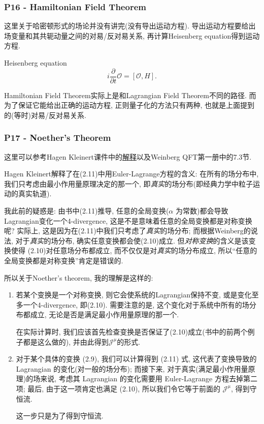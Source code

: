 \documentclass[cn,hazy,blue,11pt,device=normal,chinesefont=founder]{elegantnote}
\begin{document}
\subsubsection{P16 - Hamiltonian Field Theorem}

这里关于哈密顿形式的场论并没有讲完(没有导出运动方程). 导出运动方程要给出场变量和其共轭动量之间的对易/反对易关系, 再计算Heisenberg equation得到运动方程. 

\begin{note}
  Heisenberg equation
  \begin{equation}
    i\frac{\partial}{\partial t}\mathcal{O} = [\mathcal{O}, H].
  \end{equation}
\end{note}

Hamiltonian Field Theorem实际上是和Lagrangian Field Theorem不同的路径. 而为了保证它能给出正确的运动方程, 正则量子化的方法只有两种, 也就是上面提到的(等时)对易/反对易关系. 

\subsubsection{P17 - Noether's Theorem}

这里可以参考Hagen Kleinert课件中的\href{http: //users.physik.fu-berlin.de/~kleinert/b6/psfiles/Chapter-7-conslaw.pdf}{解释}以及Weinberg QFT第一册中的7.3节. 

Hagen Kleinert解释了在(2.11)中用Euler-Lagrange方程的含义: 在所有的场分布中, 我们只考虑由最小作用量原理决定的那一个, 即\textit{真实}的场分布(即经典力学中粒子运动的真实轨道). 

我此前的疑惑是: 由书中(2.11)推导, 任意的全局变换($\alpha$ 为常数)都会导致Lagrangian变化一个4-divergence, 这是不是意味着任意的全局变换都是对称变换呢? 实际上, 这是因为在(2.11)中我们只考虑了\textit{真实}的场分布; 而根据Weinberg的说法, 对于\textit{真实}的场分布, 确实任意变换都会使(2.10)成立. 但\textit{对称变换}的含义是该变换使得 (2.10)对任意场分布都成立, 而不仅仅是对\textit{真实}的场分布成立, 所以“任意的全局变换都是对称变换”肯定是错误的. 

所以关于Noether's theorem, 我的理解是这样的: 

\begin{enumerate}
  \item 若某个变换是一个对称变换, 则它会使系统的Lagrangian保持不变, 或是变化至多一个4-divergence, 即(2.10). 需要注意的是, 这个变化对于系统中所有的场分布都成立, 无论是否是满足最小作用量原理的那一个. 
  \begin{remark}
    在实际计算时, 我们应该首先检查变换是否保证了(2.10)成立(书中的前两个例子都是这么做的), 并由此得到$\mathcal{J}^{\mu}$的形式. 
  \end{remark}
  \item 对于某个具体的变换 (2.9), 我们可以计算得到 (2.11) 式, 这代表了变换导致的 Lagrangian 的变化(对一般的场分布); 而接下来, 对于真实(满足最小作用量原理)的场来说, 考虑其 Lagrangian 的变化需要用 Euler-Lagrange 方程去掉第二项; 最后, 由于这一项肯定也满足 (2.10), 所以我们令它等于前面的 $\mathcal{J}^{\mu}$, 得到守恒流. 
  \begin{remark}
    这一步只是为了得到守恒流. 
  \end{remark}
\end{enumerate}
\end{document}
